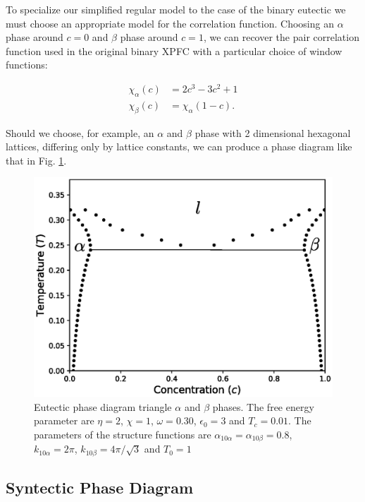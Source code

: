 \documentclass[showkeys, prb, reprint]{revtex4-1}
\begin{document}
To specialize our simplified regular model to the case of the binary eutectic
we must choose an appropriate model for the correlation function. Choosing an
$\alpha$ phase around $c = 0$ and $\beta$ phase around $c = 1$, we can recover
the pair correlation function used in the original binary XPFC with a
particular choice of window functions: 

\begin{align}
   \chi_\alpha(c) &= 2c^3 - 3c^2 + 1 \\
   \chi_\beta(c) &= \chi_\alpha(1 - c).
\end{align}

Should we choose, for example, an $\alpha$ and $\beta$ phase with 2 dimensional
hexagonal lattices, differing only by lattice constants, we can produce a phase
diagram like that in Fig. \ref{eutectic}.  

\begin{figure}
	\includegraphics[scale=0.5]{eutectic}
	\caption{\label{eutectic} Eutectic phase diagram triangle $\alpha$ and $\beta$ phases. The free energy parameter are $\eta = 2$, $\chi = 1$, $\omega=0.30$, $\epsilon_0 = 3$ and $T_c = 0.01$. The parameters of the structure functions are $\alpha_{10\alpha} = \alpha_{10\beta} = 0.8$, $k_{10\alpha} = 2\pi$, $k_{10\beta} = 4\pi/\sqrt{3}$ and $T_0 = 1$}
\end{figure}

\subsection{Syntectic Phase Diagram}
\end{document}
